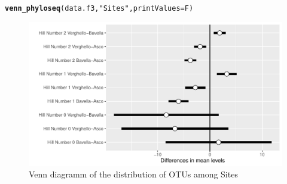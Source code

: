 \documentclass[12pt]{article}\usepackage[]{graphicx}\usepackage[]{color}
\makeatletter
\def\maxwidth{ %
  \ifdim\Gin@nat@width>\linewidth
    \linewidth
  \else
    \Gin@nat@width
  \fi
}
\newcommand{\hlstr}[1]{\textcolor[rgb]{0.192,0.494,0.8}{#1}}%
\newcommand{\hlstd}[1]{\textcolor[rgb]{0.345,0.345,0.345}{#1}}%
\newcommand{\hlkwc}[1]{\textcolor[rgb]{0.333,0.667,0.333}{#1}}%
\newcommand{\hlkwd}[1]{\textcolor[rgb]{0.737,0.353,0.396}{\textbf{#1}}}%
\newenvironment{kframe}{%
 \def\at@end@of@kframe{}%
 \ifinner\ifhmode%
  \def\at@end@of@kframe{\end{minipage}}%
  \begin{minipage}{\columnwidth}%
 \fi\fi%
 \def\FrameCommand##1{\hskip\@totalleftmargin \hskip-\fboxsep
 \colorbox{shadecolor}{##1}\hskip-\fboxsep
     \hskip-\linewidth \hskip-\@totalleftmargin \hskip\columnwidth}%
 \MakeFramed {\advance\hsize-\width
   \@totalleftmargin\z@ \linewidth\hsize
   \@setminipage}}%
 {\par\unskip\endMakeFramed%
 \at@end@of@kframe}
\newenvironment{knitrout}{}{} %
\numberwithin{figure}{section}
\makeatother
\begin{document}
\begin{knitrout}\small
{}\color{fgcolor}\begin{kframe}
\begin{alltt}
\hlkwd{venn_phyloseq}\hlstd{(data.f3,} \hlstr{"Sites"}\hlstd{,} \hlkwc{printValues} \hlstd{= F)}
\end{alltt}
\end{kframe}\begin{figure}

{\centering \includegraphics[width=\maxwidth]{figure/unnamed-chunk-47-1} 

}

\caption[Venn diagramm of the distribution of OTUs among Sites]{Venn diagramm of the distribution of OTUs among Sites}\label{fig:unnamed-chunk-47}
\end{figure}


\end{knitrout}
\end{document}
